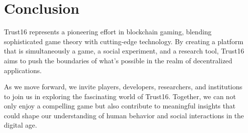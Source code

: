 \documentclass[table, twocolumn]{article}
\begin{document}
\section{Conclusion}

Trust16 represents a pioneering effort in blockchain gaming, blending sophisticated
game theory with cutting-edge technology. By creating a platform that is simultaneously
a game, a social experiment, and a research tool, Trust16 aims to push the boundaries
of what's possible in the realm of decentralized applications.

As we move forward, we invite players, developers, researchers, and institutions to
join us in exploring the fascinating world of Trust16. Together, we can not only enjoy
a compelling game but also contribute to meaningful insights that could shape our
understanding of human behavior and social interactions in the digital age.
\end{document}
